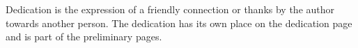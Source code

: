 \dedication{2023}{
    Dedication is the expression of a friendly connection or thanks by the author towards another person.  The dedication has its own place on the dedication page and is part of the preliminary pages.
}
